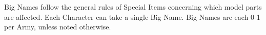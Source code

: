 
Big Names follow the general rules of Special Items concerning which model parts are affected. Each Character can take a single Big Name. Big Names are each 0-1 per Army, unless noted otherwise.

\raggedcolumns
\begin{multicols}{2}

	
	\startsortedpricelist
	

	\endsortedpricelist

	\startsortedpricelistNSP
	

	\endsortedpricelistNSP

\end{multicols}


